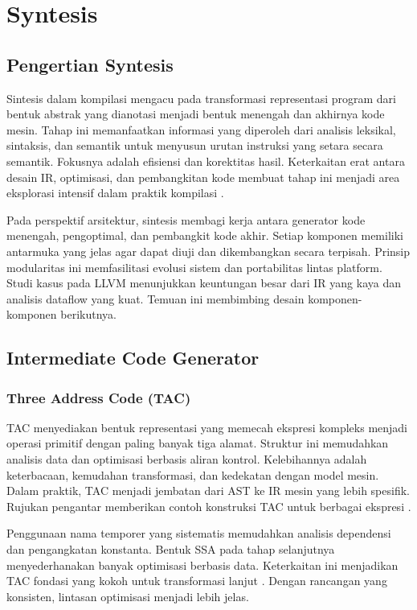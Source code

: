\documentclass[../main.tex]{subfiles}
\begin{document}
\chapter{Syntesis}

\section{Pengertian Syntesis}
Sintesis dalam kompilasi mengacu pada transformasi representasi program dari bentuk abstrak yang dianotasi menjadi bentuk menengah dan akhirnya kode mesin. Tahap ini memanfaatkan informasi yang diperoleh dari analisis leksikal, sintaksis, dan semantik untuk menyusun urutan instruksi yang setara secara semantik. Fokusnya adalah efisiensi dan korektitas hasil. Keterkaitan erat antara desain IR, optimisasi, dan pembangkitan kode membuat tahap ini menjadi area eksplorasi intensif dalam praktik kompilasi \citep{LLVMOverview,WikiOptimization}.

Pada perspektif arsitektur, sintesis membagi kerja antara generator kode menengah, pengoptimal, dan pembangkit kode akhir. Setiap komponen memiliki antarmuka yang jelas agar dapat diuji dan dikembangkan secara terpisah. Prinsip modularitas ini memfasilitasi evolusi sistem dan portabilitas lintas platform. Studi kasus pada LLVM menunjukkan keuntungan besar dari IR yang kaya dan analisis dataflow yang kuat. Temuan ini membimbing desain komponen-komponen berikutnya.

\section{Intermediate Code Generator}
\subsection{Three Address Code (TAC)}
TAC menyediakan bentuk representasi yang memecah ekspresi kompleks menjadi operasi primitif dengan paling banyak tiga alamat. Struktur ini memudahkan analisis data dan optimisasi berbasis aliran kontrol. Kelebihannya adalah keterbacaan, kemudahan transformasi, dan kedekatan dengan model mesin. Dalam praktik, TAC menjadi jembatan dari AST ke IR mesin yang lebih spesifik. Rujukan pengantar memberikan contoh konstruksi TAC untuk berbagai ekspresi \citep{WikiTAC}.

Penggunaan nama temporer yang sistematis memudahkan analisis dependensi dan pengangkatan konstanta. Bentuk SSA pada tahap selanjutnya menyederhanakan banyak optimisasi berbasis data. Keterkaitan ini menjadikan TAC fondasi yang kokoh untuk transformasi lanjut \citep{WikiTAC}. Dengan rancangan yang konsisten, lintasan optimisasi menjadi lebih jelas.
\end{document}
